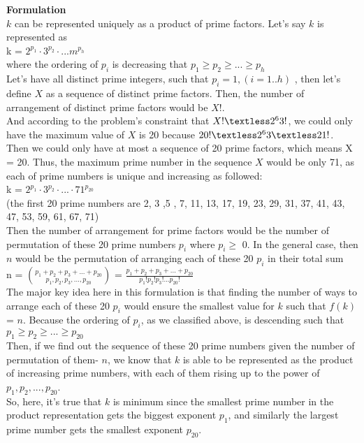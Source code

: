 \documentclass[12pt]{article}
\begin{document}
	\textbf{Formulation} \\
	$k$ can be represented uniquely as a product of prime factors. Let's say $k$ is represented as \\
	 k = $2^{p_1}\cdot 3^{p_2}\cdot ... m^{p_h}$ \\
	 where the ordering of $p_i$ is decreasing that $p_1 \geq p_2 \geq...\geq p_h$  \\

	Let's have all distinct prime integers, such that $p_i = 1, (i = 1..h)$ , then let's define $X$ as a sequence of distinct prime factors. Then, the number of arrangement of distinct prime factors would be $X$!. \\
	And according to the problem's constraint that $X! \textless  2^63!$, we could only have the maximum value of $X$ is 20 because $20! \textless   2^63 \textless 21!$. \\
	Then we could only have at most a sequence of 20 prime factors, which means X = 20.
	Thus, the maximum prime number in the sequence $X$ would be only 71, as each of prime numbers is unique and increasing as followed: \\
	k = $2^{p_1} \cdot 3^{p_2}\cdot ...\cdot 71^{p_20}$ \\
	(the first 20 prime numbers are 2, 3 ,5 , 7, 11, 13, 17, 19, 23, 29, 31, 37, 41, 43, 47, 53, 59, 61, 67, 71)\\
	Then the number of arrangement for prime factors would be the number of permutation of these 20 prime numbers  $p_i$ where  $p_i \geq$ 0. In the general case, then $n$ would be the permutation of arranging each of these 20 $p_i$ in their total sum\\

n = $\binom{ p_1 +  p_2 +   p_3 +... +  p_20 } {p_1 ,  p_2,  p_3,  ... ,  p_20}$
=  $\frac{p_1 +  p_2 +   p_3 +... +  p_20 }
{p_1! p_2! p_3!...p_20!}$  \\

	The major key idea here in this formulation is that finding the number of ways to arrange each of these 20 $p_i$ would ensure the smallest value for $k$ such that $f(k)$ = $n$. Because the ordering of $p_i$, as we classified above, is descending such that \\
	$p_1 \geq p_2 \geq ... \geq p_20$ \\
Then, if we find out the sequence of these 20 prime numbers given the number of permutation of them- $n$, we know that $k$ is able to be represented as the product of increasing prime numbers, with each of them rising up to the power of $p_1, p_2, ... ,p_20$. \\
So, here, it's true that $k$ is minimum since the smallest prime number in the product representation gets the biggest exponent $p_1$, and similarly the largest prime number gets the smallest exponent $p_20$.
\end{document}

